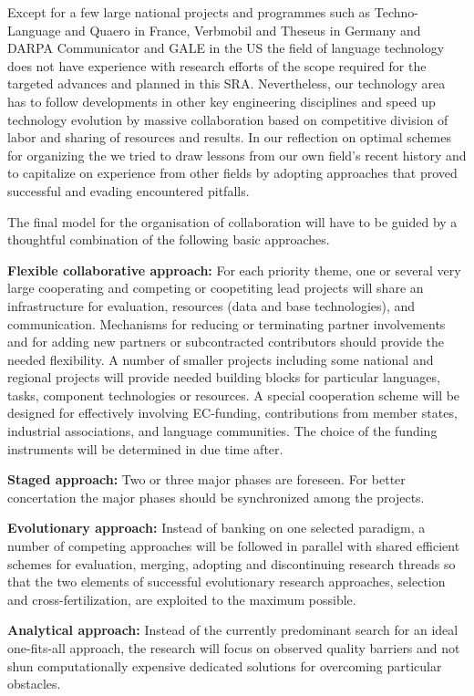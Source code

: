 \documentclass[10pt, plain]{../../metanetpaper}
\begin{document}
\begin{multicols}{2}
Except for a few large national projects and programmes such as Techno-Language and Quaero in France, Verbmobil and Theseus in Germany and DARPA Communicator and GALE in the US the field of language technology does not have experience with research efforts of the scope required for the targeted advances and planned in this SRA.  Nevertheless, our technology area has to follow developments in other key engineering disciplines and speed up technology evolution by massive collaboration based on competitive division of labor and sharing of resources and results. In our reflection on optimal schemes for organizing the we tried to draw lessons from our own field’s recent history and to capitalize on experience from other fields by adopting approaches that proved successful and evading encountered pitfalls.
 
The final model for the organisation of collaboration will have to be guided by a thoughtful combination of the following basic approaches.
 
\textbf{Flexible collaborative approach:}  For each priority theme, one or several very large cooperating and competing or coopetiting lead projects will share an infrastructure for evaluation, resources (data and base technologies), and communication. Mechanisms for reducing or terminating partner involvements and for adding new partners or subcontracted contributors should provide the needed flexibility. A number of smaller projects including some national and regional projects will provide needed building blocks for particular languages, tasks, component technologies or resources. A special cooperation scheme will be designed for effectively involving EC-funding, contributions from member states, industrial associations, and language communities. The choice of the funding instruments will be determined in due time after.

\textbf{Staged approach:} Two or three major phases are foreseen. For better concertation the major phases should be synchronized among the projects.   

\textbf{Evolutionary approach:} Instead of banking on one selected paradigm, a number of competing approaches will be followed in parallel with shared efficient schemes for evaluation, merging, adopting and discontinuing research threads so that the two elements of successful evolutionary research approaches, selection and cross-fertilization, are exploited to the maximum possible.

\textbf{Analytical approach:} Instead of the currently predominant search for an ideal one-fits-all approach, the research will focus on observed quality barriers and not shun computationally expensive dedicated solutions for overcoming particular obstacles.


\end{multicols}
\end{document}
